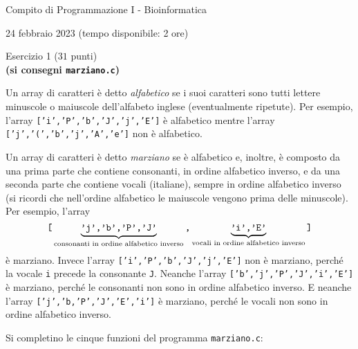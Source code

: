 \documentclass[12pt]{article}
\begin{document}
\begin{center}{\LARGE Compito di Programmazione I - Bioinformatica}\\
\begin{center}
  \large 24 febbraio 2023 (tempo disponibile: 2 ore)
\end{center}
\end{center}

\vspace*{1ex}
\begin{center}{\Large Esercizio 1} ($31$ punti)\\
  \textbf{(si consegni \texttt{marziano.c})}
\end{center}

Un array di caratteri \`e detto \emph{alfabetico} se i suoi caratteri
sono tutti lettere minuscole o maiuscole dell'alfabeto inglese (eventualmente ripetute).
Per esempio, l'array \texttt{['i','P','b','J','j','E']} \`e alfabetico
mentre l'array \texttt{['j','(','b','j','A','e']} non \`e alfabetico.

Un array di caratteri \`e detto \emph{marziano} se \`e alfabetico
e, inoltre, \`e composto da una prima parte che contiene
consonanti, in ordine alfabetico inverso, e da una seconda parte che contiene
vocali (italiane), sempre in ordine alfabetico inverso (si ricordi che nell'ordine alfabetico
le maiuscole vengono prima delle minuscole).
Per esempio, l'array
\[
\mbox{\texttt{[}}\underbrace{\mbox{\texttt{'j','b','P','J'}}}_{\text{consonanti in ordine alfabetico inverso}}\mbox{\texttt{,}}\underbrace{\mbox{\texttt{'i','E'}}}_{\text{vocali in ordine alfabetico inverso}}\mbox{\texttt{]}}
\]
\`e marziano.
Invece l'array \texttt{['i','P','b','J','j','E']} non \`e marziano, perch\'e la
vocale \texttt{i} precede la consonante \texttt{J}.
Neanche l'array \texttt{['b','j','P','J','i','E']} \`e marziano, perch\'e
le consonanti non sono in ordine alfabetico inverso.
E neanche l'array \texttt{['j','b,'P','J','E','i']} \`e marziano, perch\'e
le vocali non sono in ordine alfabetico inverso.

Si completino le cinque funzioni del programma \texttt{marziano.c}:
\end{document}
